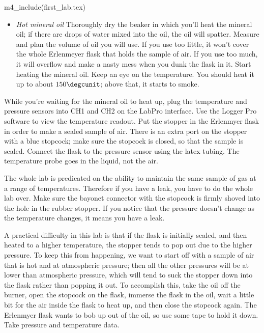 \observations
m4_include(first_lab.tex)

\begin{itemize}
\item \emph{Hot mineral oil}
Thoroughly dry the beaker in which you'll heat the mineral oil; if there are drops of water
mixed into the oil, the oil will spatter. Measure and plan the volume of oil you will use.
If you use too little, it won't cover the whole Erlenmeyer flask that holds the sample of air. If you use too much, it will
overflow and make a nasty mess when you dunk the flask in it.
Start heating the mineral oil. Keep an eye on the temperature. You should heat it up to about
$150\degcunit$; above that, it starts to smoke.
\end{itemize}

While you're waiting for the mineral oil to heat up,
plug the temperature and pressure sensors into CH1 and CH2 on
the LabPro interface. Use the Logger Pro software to view the temperature readout.
Put the stopper in the Erlenmyer flask in order to make a
sealed sample of air. There is an extra port on the stopper
with a blue stopcock; make sure the stopcock is closed, so that
the sample is sealed. Connect the flask to the pressure
sensor using the latex tubing. The temperature probe goes in
the liquid, not the air.

The whole lab is predicated on the ability to maintain the same sample
of gas at a range of temperatures. Therefore if you have a leak, you have
to do the whole lab over.
Make sure the bayonet connector with
the stopcock is firmly shoved into the hole in the rubber stopper.
If you notice that the pressure doesn't change as the temperature changes,
it means you have a leak.

A practical difficulty in this lab is that if the flask
is initially sealed, and then heated to a higher temperature,
the stopper tends to pop out due to the higher pressure.
To keep this from happening, we want to start off with a
sample of air that is hot and at atmospheric pressure; then
all the other pressures will be at lower than atmospheric
pressure, which will tend to suck the stopper down into the
flask rather than popping it out. To accomplish this,
take the oil off the burner,
open the stopcock on the flask, immerse the flask in the oil,
wait a little bit for the air inside the flask to heat
up, and then close the stopcock again. The Erlenmyer flask wants to bob up out of the
oil, so use some tape to hold it down.
Take pressure and temperature data.

